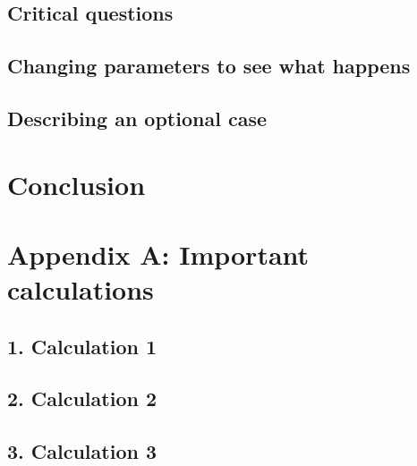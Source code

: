 \documentclass[reprint,english,notitlepage]{revtex4-1}
\begin{document}
\subsection{Critical questions}


\subsection{Changing parameters to see what happens}


\subsection{Describing an optional case}


\section{Conclusion}


\section*{Appendix A: Important calculations}
\subsection*{1. Calculation 1}


\subsection*{2. Calculation 2}


\subsection*{3. Calculation 3}




\onecolumngrid
\vspace{1cm}
\begin{thebibliography}{9}

\end{thebibliography}
\end{document}
